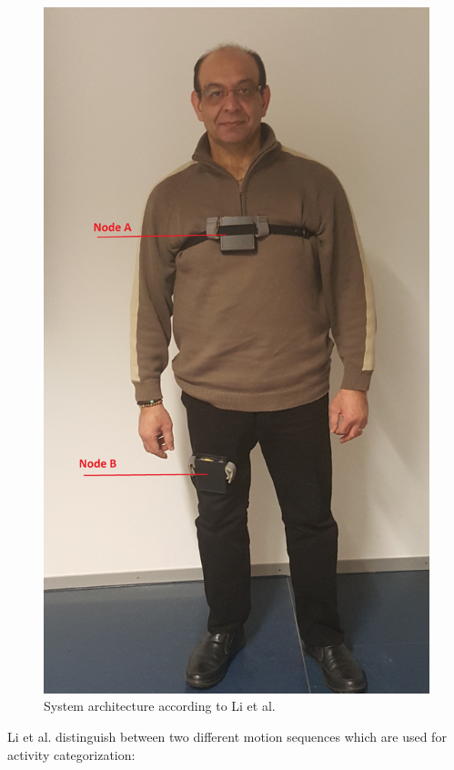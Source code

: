 \documentclass[review]{elsarticle}
\begin{document}
\begin{figure}[!ht]
	\centering
	\includegraphics[scale=0.06]{Images/Stankovic_papa2}
	\caption[System architecture according to Li et al.]{System architecture according to Li et al. \cite{Li2009}}
	\label{fig:LietAl-Architecture}
\end{figure}
Li et al. distinguish between two different motion sequences which are used for activity categorization:
\end{document}
